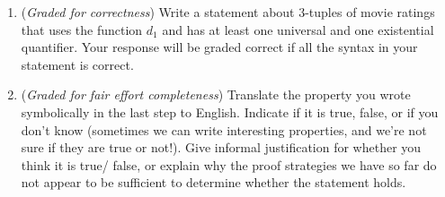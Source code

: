 \documentclass[12pt, oneside]{article}
\begin{document}
\begin{enumerate}
\begin{enumerate}
    \item ({\it Graded for correctness}) Write a statement about 3-tuples of movie ratings that uses the function 
    $d_1$ and has at least one universal and one existential quantifier. Your response will be 
    graded correct if all the syntax in your statement is correct.

    \item ({\it Graded for fair effort completeness}) Translate the property you wrote symbolically in the 
    last step to English. Indicate if it is true, false, or if you don't know 
    (sometimes we can write interesting properties, and we're not sure if they are true or not!). 
    Give informal justification for whether  you think it is true/ false, or explain why 
    the proof strategies we have so far do not appear to  be sufficient to determine whether the statement holds.
    \end{enumerate}

\end{enumerate}
\end{document}
